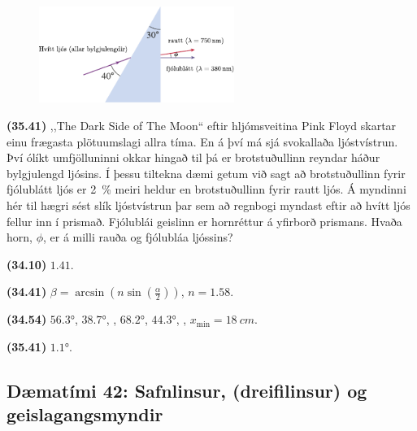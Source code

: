 \begin{enumerate}[label = \textbf{(\alph*)}]
\vspace{0.5cm}

\begin{minipage}{\linewidth}
\begin{figure}
\vspace{-0.5cm}
\includegraphics[width = 2.5in]{figures/rk3441.pdf}
\end{figure}

\item[\textbf{(35.41)}] ,,The Dark Side of The Moon`` eftir hljómsveitina Pink Floyd skartar einu frægasta plötuumslagi allra tíma. En á því má sjá svokallaða ljóstvístrun. Því ólíkt umfjölluninni okkar hingað til þá er brotstuðullinn reyndar háður bylgjulengd ljósins. Í þessu tiltekna dæmi getum við sagt að brotstuðullinn fyrir fjólublátt ljós er \SI{2}{\percent} meiri heldur en brotstuðullinn fyrir rautt ljós. Á myndinni hér til hægri sést slík ljóstvístrun þar sem að regnbogi myndast eftir að hvítt ljós fellur inn í prismað. Fjólublái geislinn er hornréttur á yfirborð prismans. Hvaða horn, $\phi$, er á milli rauða og fjólubláa ljóssins?



\end{minipage}

\end{enumerate}

\begin{tcolorbox}
\begin{enumerate*}[label = ]
  \item \textbf{(34.10)} $\num{1.41}$.
  \item \textbf{(34.41)} $\beta = \arcsin(n\sin(\tfrac{\alpha}{2}))$, $n = \num{1.58}$.
  \item \textbf{(34.54)} $\ang{56.3}$, $\ang{38.7}$, , $\ang{68.2}$, $\ang{44.3}$, , $x_{\text{min}} = \SI{18}{cm}$.
  \item \textbf{(35.41)} $\ang{1.1}$.
\end{enumerate*}
\end{tcolorbox}

\newpage

\subsection*{Dæmatími 42: Safnlinsur, (dreifilinsur) og geislagangsmyndir}

